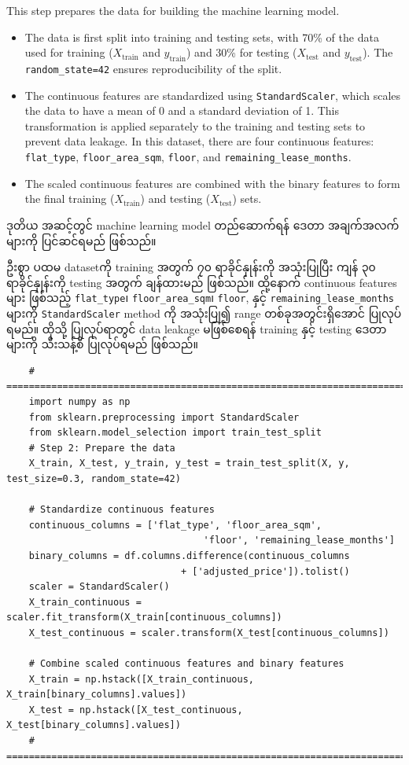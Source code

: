 \begin{step}
This step prepares the data for building the machine learning model. 
\begin{itemize}
  \item The data is first split into training and testing sets, with 70\% of the data used for training (\(X_{\text{train}}\) and \(y_{\text{train}}\)) and 30\% for testing (\(X_{\text{test}}\) and \(y_{\text{test}}\)). The \texttt{random\_state=42} ensures reproducibility of the split.
  \item The continuous features are standardized using \texttt{StandardScaler}, which scales the data to have a mean of 0 and a standard deviation of 1. This transformation is applied separately to the training and testing sets to prevent data leakage. In this dataset, there are four continuous features: \texttt{flat\_type}, \texttt{floor\_area\_sqm}, \texttt{floor}, and \texttt{remaining\_lease\_months}.
  \item The scaled continuous features are combined with the binary features to form the final training (\(X_{\text{train}}\)) and testing (\(X_{\text{test}}\)) sets.
\end{itemize}

ဒုတိယ အဆင့်တွင် machine learning model တည်ဆောက်ရန် ဒေတာ အချက်အလက်များကို ပြင်ဆင်ရမည် ဖြစ်သည်။

ဦးစွာ ပထမ datasetကို training အတွက် ၇၀ ရာခိုင်နှုန်းကို အသုံးပြုပြီး ကျန် ၃၀ ရာခိုင်နှုန်းကို testing အတွက် ချန်ထားမည် ဖြစ်သည်။ ထို့နောက် continuous features များ ဖြစ်သည့် \texttt{flat\_type}၊ \texttt{floor\_area\_sqm}၊  \texttt{floor}, နှင့် \texttt{remaining\_lease\_months} များကို \texttt{StandardScaler} method ကို အသုံးပြု၍ range တစ်ခုအတွင်းရှိအောင် ပြုလုပ်ရမည်။ ထိုသို့ ပြုလုပ်ရာတွင် data leakage မဖြစ်စေရန် training နှင့် testing ဒေတာများကို သီးသန့်စီ ပြုလုပ်ရမည် ဖြစ်သည်။ 

\end{step}
\begin{lstlisting}
    # =========================================================================#
    import numpy as np
    from sklearn.preprocessing import StandardScaler
    from sklearn.model_selection import train_test_split
    # Step 2: Prepare the data
    X_train, X_test, y_train, y_test = train_test_split(X, y, test_size=0.3, random_state=42)

    # Standardize continuous features
    continuous_columns = ['flat_type', 'floor_area_sqm',  
                                   'floor', 'remaining_lease_months']
    binary_columns = df.columns.difference(continuous_columns 
                               + ['adjusted_price']).tolist()
    scaler = StandardScaler()
    X_train_continuous = scaler.fit_transform(X_train[continuous_columns])
    X_test_continuous = scaler.transform(X_test[continuous_columns])
    
    # Combine scaled continuous features and binary features
    X_train = np.hstack([X_train_continuous, X_train[binary_columns].values])
    X_test = np.hstack([X_test_continuous, X_test[binary_columns].values])
    # =========================================================================#
\end{lstlisting}  
